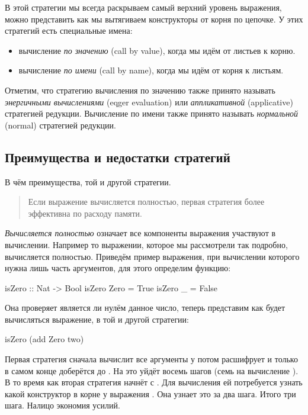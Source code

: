 В этой стратегии мы всегда раскрываем самый верхний уровень выражения,
можно представить как мы вытягиваем конструкторы от корня по цепочке. У
этих стратегий есть специальные имена:

\begin{itemize}
\item
  вычисление \emph{по значению} (call by value), когда мы идём от
  листьев к корню.
\item
  вычисление \emph{по имени} (call by name), когда мы идём от корня к
  листьям.
\end{itemize}

Отметим, что стратегию вычисления по значению также принято называть
\emph{энергичными вычислениями} (eqger evaluation) или
\emph{аппликативной} (applicative) стратегией редукции. Вычисление по
имени также принято называть \emph{нормальной} (normal) стратегией
редукции.

\subsection{Преимущества и недостатки стратегий}

В чём преимущества, той и другой стратегии.

\begin{quote}
Если выражение вычисляется полностью, первая стратегия более эффективна
по расходу памяти.
\end{quote}

\emph{Вычисляется полностью} означает все компоненты выражения участвуют
в вычислении. Например то выражении, которое мы рассмотрели так
подробно, вычисляется полностью. Приведём пример выражения, при
вычислении которого нужна лишь часть аргументов, для этого определим
функцию:


\begin{code}
isZero :: Nat -> Bool
isZero Zero     = True
isZero _        = False
\end{code}

Она проверяет является ли нулём данное число, теперь представим как
будет вычисляться выражение, в той и другой стратегии:


\begin{code}
isZero (add Zero two)
\end{code}

Первая стратегия сначала вычислит все аргументы у  потом
расшифрует  и только в самом конце доберётся до . На
это уйдёт восемь шагов (семь на вычисление ). В то
время как вторая стратегия начнёт с . Для вычисления
 ей потребуется узнать какой конструктор в корне у выражения
. Она узнает это за два шага. Итого три шага. Налицо
экономия усилий.

